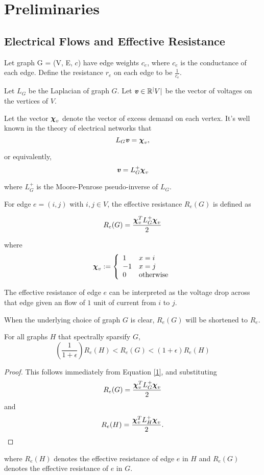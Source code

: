 \section{Preliminaries}
\subsection{Electrical Flows and Effective Resistance}

Let graph G = (V, E, $c$) have edge weights $c_e$, where $c_e$ is the conductance of each edge.  Define the resistance $r_e$ on each edge to be $\frac{1}{c_e}$. 

Let $L_G$ be the Laplacian of graph $G$. Let $\boldsymbol{\mathit{v}} \in \mathbb{R}^|V|$ be the vector of voltages on the vertices of $V$.

Let the vector $\boldsymbol{\chi}_v$ denote the vector of excess demand on each vertex. It's well known in the theory of electrical networks that
\begin{equation}
L_G \boldsymbol{\mathit{v}} = \boldsymbol{\chi}_v,
\end{equation}

or equivalently,
\begin{equation}
\boldsymbol{\mathit{v}} = L_G^{+} \boldsymbol{\chi}_v
\end{equation}

where $L_G^{+}$ is the Moore-Penrose pseudo-inverse of $L_G$.

For edge $e = (i, j)$ with $i, j \in V$, the effective resistance $R_e(G)$ is defined as

\begin{equation}
R_e(G) = \frac{\boldsymbol{\chi}_v^TL_G^{+} \boldsymbol{\chi}_v}{2}
\end{equation}

where 
\begin{equation}\label{chiv}
   \boldsymbol{\chi}_v := \left\{
     \begin{array}{ll}
       1  &  x = i\\
       -1 &  x = j\\
       0  & \text{otherwise} 
     \end{array}
   \right.
\end{equation} 

The effective resistance of edge $e$ can be interpreted as the voltage drop across that edge given an flow of $1$ unit of current from $i$ to $j$. 

When the underlying choice of graph $G$ is clear, $R_e(G)$ will be shortened to $R_e$.

\begin{lemma} \label{effectresist}
For all graphs $H$ that spectrally sparsify $G$, 
\begin{equation}
\left(\frac{1}{1+\epsilon}\right) R_e(H) < R_e(G) < (1+\epsilon) R_e(H)
\end{equation}

\begin{proof} This follows immediately from Equation \ref{1}, and substituting
$$R_e(G) = \frac{\boldsymbol{\chi}_v^TL_G^{+} \boldsymbol{\chi}_v}{2}$$
and
$$R_e(H) = \frac{\boldsymbol{\chi}_v^TL_H^{+} \boldsymbol{\chi}_v}{2}.$$
\end{proof}
where $R_e(H)$ denotes the effective resistance of edge $e$ in $H$ and $R_e(G)$ denotes the effective resistance of $e$ in $G$.
\end{lemma}
